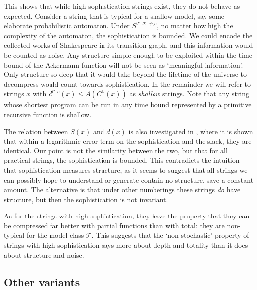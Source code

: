 \documentclass{style/llncs}
\newcommand{\C}{\mathscr C}
\newcommand{\T}{\mathscr T}
\newcommand{\K}{\mathscr K}
\begin{document}
\noindent This shows that while high-sophistication strings exist, they do not behave as expected. Consider a string that is typical for a shallow model, say some elaborate probabilistic automaton. Under $S^{\T,\K, \psi,c}$, no matter how high the complexity of the automaton, the sophistication is bounded. We could encode the collected works of Shakespeare in its transition graph, and this information would be counted as noise. Any structure simple enough to be exploited within the time bound of the Ackermann function will not be seen as `meaningful information'. Only structure so deep that it would take beyond the lifetime of the universe to decompress would count towards sophistication. In the remainder we will refer to strings $x$ with $d^{\C,c}(x) \leq A(C^\C(x))$ as \emph{shallow} strings. Note that any string whose shortest program can be run in any time bound represented by a primitive recursive function is shallow. 

The relation between $S(x)$ and $d(x)$ is also investigated in \cite{antunes2013sophistication}, where it is shown that within a logarithmic error term on the sophistication and the slack, they are identical. Our point is not the similarity between the two, but that for all practical strings, the sophistication is bounded. This contradicts the intuition that sophistication measures structure, as it seems to suggest that all strings we can possibly hope to understand or generate contain no structure, save a constant amount. The alternative is that under other numberings these strings \emph{do} have structure, but then the sophistication is not invariant.

As for the strings with high sophistication, they have the property that they can be compressed far better with partial functions than with total: they are non-typical for the model class $\T$. This suggests that the `non-stochastic' property of strings with high sophistication \cite{shen1983concept,vereshchagin2004kolmogorov} says more about depth and totality than it does about structure and noise.

\subsection{Other variants} 
\label{section:other}
\end{document}
